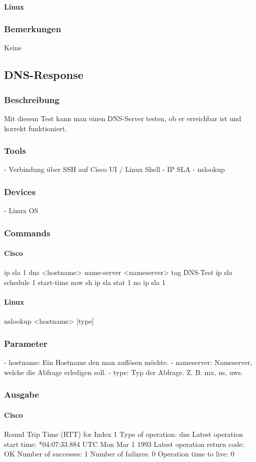 \documentclass[a4,12pt]{scrartcl}
\begin{document}
\paragraph{Linux}
\subsubsection{Bemerkungen}
Keine


\subsection{DNS-Response}
\subsubsection{Beschreibung}
Mit diesem Test kann man einen DNS-Server testen, ob er erreichbar ist und korrekt funktioniert.
\subsubsection{Tools}
- Verbindung über SSH auf Cisco UI / Linux Shell
- IP SLA
- nslookup
\subsubsection{Devices}
- Linux OS
\subsubsection{Commands}
\paragraph{Cisco}
ip sla 1
dns <hostname> name-server <nameserver>
tag DNS-Test
ip sla schedule 1 start-time now
sh ip sla stat 1
no ip sla 1
			
\paragraph{Linux}
nslookup <hostname> [type]
\subsubsection{Parameter}
- hostname: Ein Hostname den man auflösen möchte.
- nameserver: Nameserver, welche die Abfrage erledigen soll.
- type: Typ der Abfrage. Z. B. mx, ns, uws.
\subsubsection{Ausgabe}
\paragraph{Cisco}
Round Trip Time (RTT) for       Index 1
Type of operation: dns
Latest operation start time: *04:07:33.884 UTC Mon Mar 1 1993
Latest operation return code: OK
Number of successes: 1
Number of failures: 0
Operation time to live: 0
\end{document}
